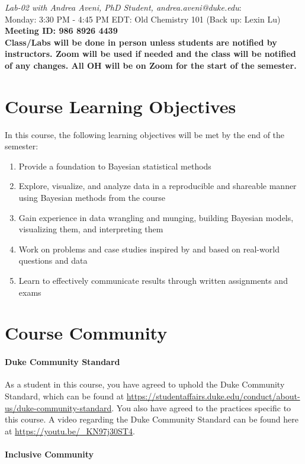 \documentclass[11pt]{article}
\begin{document}
\emph{Lab-02 with Andrea Aveni, PhD Student, andrea.aveni@duke.edu}: \\Monday: 3:30 PM - 4:45 PM EDT: Old Chemistry 101 (Back up: Lexin Lu) \\
\textbf{Meeting ID: 986 8926 4439}\\


\textbf{Class/Labs will be done in person unless students are notified by instructors. Zoom will be used if needed and the class will be notified of any changes. All OH will be on Zoom for the start of the semester.}


\section{Course Learning Objectives}
In this course, the following learning objectives will be met by the end of the semester:
\begin{enumerate}
\item Provide a foundation to Bayesian statistical methods
\item Explore, visualize, and analyze data in a reproducible and shareable manner using Bayesian methods from the course
\item Gain experience in data wrangling and munging, building Bayesian models, visualizing them, and interpreting them 
\item Work on problems and case studies inspired by and based on real-world questions and data
\item Learn to effectively communicate results through written assignments and exams 
\end{enumerate}

\section{Course Community}



\paragraph{Duke Community Standard} 
As a student in this course, you have agreed to uphold the Duke Community Standard, which can be found at \url{https://studentaffairs.duke.edu/conduct/about-us/duke-community-standard}. You also have agreed to the practices specific to this course.  A video regarding the Duke Community Standard can be found here at \url{https://youtu.be/_KN97j30ST4}. 


\paragraph{Inclusive Community}
\end{document}
